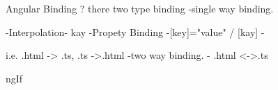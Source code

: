 Angular Binding ?
there two type binding
        -single way binding.

            -Interpolation- {{kay}}
            -Propety Binding -[key]="value" / [kay]
            -

            i.e. .html -> .ts, .ts ->.html
        -two way binding.
            - .html <->.ts
            
ngIf



